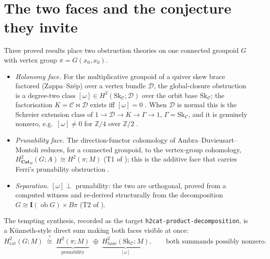 \documentclass[11pt]{article}
\theoremstyle{definition}
\newcommand{\ob}{\operatorname{ob}}
\newcommand{\Sk}{\mathrm{Sk}}
\newcommand{\C}{\mathcal{C}}
\newcommand{\D}{\mathcal{D}}
\newcommand{\Z}{\mathbb{Z}}
\newcommand{\CatB}{\mathbf{Cat}_B}
\newcommand{\Igp}{\mathbf{I}}
\newcommand{\Bpi}{B\pi}
\begin{document}
\section{The two faces and the conjecture they invite}

Three proved results place two obstruction theories on one connected groupoid
$G$ with vertex group $\pi=G(x_0,x_0)$.

\begin{itemize}
\item[\textbf{(H)}] \emph{Holonomy face.} For the multiplicative groupoid of a
quiver skew brace factored (Zappa--Sz\'ep) over a vertex bundle $\D$, the
global-closure obstruction is a degree-two class $[\omega]\in H^2(\Sk_\C;\D)$
over the orbit base $\Sk_\C$; the factorisation $K=\C\bowtie\D$ exists iff
$[\omega]=0$ \cite{gobstr}. When $\D$ is normal this is the Schreier extension
class of $1\to\D\to K\to\Gamma\to1$, $\Gamma=\Sk_\C$, and it is genuinely
nonzero, e.g.\ $[\omega]\neq0$ for $\Z/4$ over $\Z/2$ \cite{gzs}.
\item[\textbf{(P)}] \emph{Prunability face.} The direction-functor cohomology of
Ambra--Duvieusart--Montoli \cite{adm} reduces, for a connected groupoid, to the
vertex-group cohomology, $H^2_{\CatB}(G;A)\cong H^2(\pi;M)$ (T1 of \cite{sep2});
this is the additive face that carries Ferri's prunability obstruction
\cite{sep}.
\item[\textbf{(S)}] \emph{Separation.} $[\omega]\perp$ prunability: the two are
orthogonal, proved from a computed witness \cite{sep} and re-derived
structurally from the decomposition $G\cong\Igp(\ob G)\times\Bpi$ (T2 of
\cite{sep2}).
\end{itemize}

The tempting synthesis, recorded as the target \texttt{h2cat-product-decomposition},
is a Künneth-style direct sum making both faces visible at once:
\begin{equation}\label{eq:conj}
   H^2_{\mathrm{cat}}(G;M)\;\overset{?}{\cong}\;
   \underbrace{H^2(\pi;M)}_{\text{prunability}}\;\oplus\;
   \underbrace{H^2_{\mathrm{base}}(\Sk_\C;M)}_{[\omega]},
   \qquad\text{both summands possibly nonzero.}
\end{equation}
\end{document}
